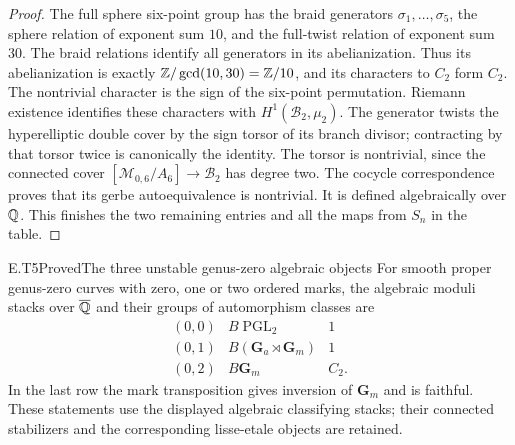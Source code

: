 \begin{proof}
The full sphere six-point group has the braid generators
$\sigma_1,\ldots,\sigma_5$, the sphere relation of exponent
sum $10$, and the full-twist relation of exponent sum $30$.
The braid relations identify all generators in its
abelianization.  Thus its abelianization is exactly
$\mathbb Z/\gcd(10,30)=\mathbb Z/10$, and its characters to $C_2$ form
$C_2$.  The nontrivial character is the sign of the six-point
permutation.  Riemann existence identifies these characters
with $H^1(\mathcal B_2,\mu_2)$.
The generator twists the hyperelliptic double cover by the
sign torsor of its branch divisor; contracting by that
torsor twice is canonically the identity.  The torsor is
nontrivial, since the connected cover
$[\mathcal M_{0,6}/A_6]\to\mathcal B_2$ has degree two.
The cocycle correspondence proves that its gerbe
autoequivalence is nontrivial.  It is defined algebraically
over $\mathbb Q$.  This finishes the two remaining entries and
all the maps from $S_n$ in the table.
\end{proof}

\begin{result}{E.T5}{Proved}{The three unstable genus-zero algebraic objects}
For smooth proper genus-zero curves with zero, one or two
ordered marks, the algebraic moduli stacks over
$\overline{\mathbb Q}$ and their groups of automorphism classes are
\[
\begin{array}{c|c|c}
 (0,0)&B\operatorname{PGL}_2&1\\
 (0,1)&B(\mathbf G_a\rtimes\mathbf G_m)&1\\
 (0,2)&B\mathbf G_m&C_2.
\end{array}
\]
In the last row the mark transposition gives inversion
of $\mathbf G_m$ and is faithful.  These statements use
the displayed algebraic classifying stacks; their
connected stabilizers and the corresponding lisse-etale
objects are retained.
\end{result}

